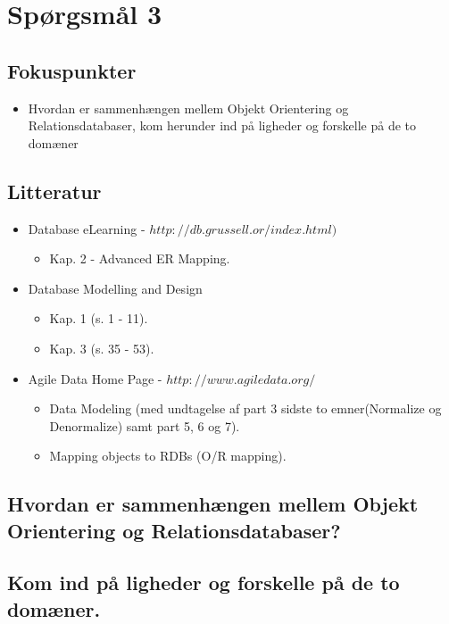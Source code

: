 \section{Spørgsmål 3}

\subsection{Fokuspunkter}
\begin{itemize}
	\item Hvordan er sammenhængen mellem Objekt Orientering og Relationsdatabaser, kom herunder ind på ligheder og forskelle på de to domæner
\end{itemize}

\subsection{Litteratur}
\begin{itemize}
	\item Database eLearning - $http://db.grussell.or/index.html)$
	\begin{itemize}
		\item Kap. 2 - Advanced ER Mapping.
	\end{itemize}
	\item Database Modelling and Design
	\begin{itemize}
		\item Kap. 1 (s. 1 - 11).
		\item Kap. 3 (s. 35 - 53).
	\end{itemize}
	\item Agile Data Home Page - $http://www.agiledata.org/$
	\begin{itemize}
		\item Data Modeling (med undtagelse af part 3 sidste to emner(Normalize og Denormalize) samt part 5, 6 og 7).
		\item Mapping objects to RDBs (O/R mapping).
	\end{itemize}
\end{itemize}

\subsection{Hvordan er sammenhængen mellem Objekt Orientering og Relationsdatabaser?}

\subsection{Kom ind på ligheder og forskelle på de to domæner.}